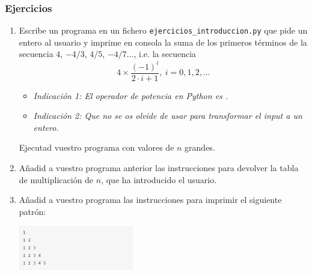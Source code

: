 \documentclass[handout,9pt]{beamer}
\begin{document}
\begin{frame}[fragile]
  \frametitle{Ejercicios}
  \begin{enumerate}
    \item Escribe un programa en un fichero {\tt ejercicios\_introduccion.py} que
      pide un entero  al usuario y imprime en consola la suma
      de los primeros   términos de la secuencia $4$, $-4/3$, $4/5$, $-4/7
      \ldots$, i.e. la secuencia
      $$ 4\times \frac{(-1)^{i}}{2\cdot i + 1},\ i = 0, 1, 2, \ldots$$
      \begin{itemize}
      \item \textit{Indicación 1: El operador de potencia en Python es
          \pyv{**}.}
      \item \textit{Indicación 2: Que no se os olvide de usar
           para transformar el input a un entero.}
      \end{itemize}
      Ejecutad vuestro programa con valores de $n$ grandes.
    \item Añadid a vuestro programa anterior
            las instrucciones para devolver la tabla de multiplicación
      de $n$, que ha introducido el usuario.
    \item Añadid a vuestro programa las instrucciones para imprimir el siguiente patrón:
      \begin{center}
        \includegraphics[width=5cm]{for_exercises_01}
      \end{center}
    \end{enumerate}  
  \end{frame}
\end{document}
